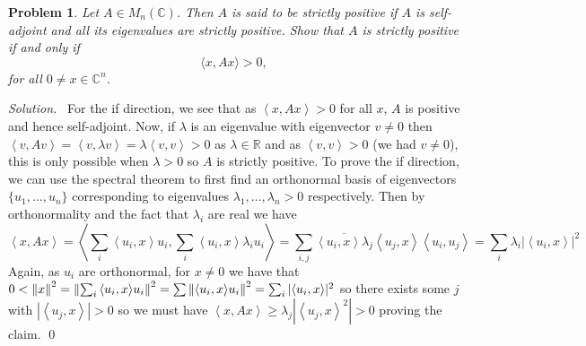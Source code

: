 \documentclass[12pt,a4paper]{article}
\newenvironment{solution}{%
  \par\noindent\textit{Solution.}\ }{\qed}
\theoremstyle{problemstyle}
\newtheorem{problem}{Problem}[section]
\def\bR{\mathbb{R}}
\newcommand{\ipp}[1]{{\left\langle{#1}\right\rangle}}
\begin{document}
\begin{problem}\label{prob:4-10}
Let $A \in M_n(\mathbb{C})$. Then $A$ is said to be \emph{strictly positive} if $A$ is self-adjoint and all its eigenvalues are strictly positive. Show that $A$ is strictly positive if and only if
\[
\langle x, Ax \rangle > 0,
\]
for all $0 \neq x \in \mathbb{C}^n$.
\end{problem}
\begin{solution}
	For the if direction, we see that as $\ipp{x,Ax}>0$ for all $x$, $A$ is positive and hence self-adjoint. 
	Now, if $\lambda$ is an eigenvalue with eigenvector $v\neq 0$ then $\ipp{v,Av}=\ipp{v,\lambda v}=\lambda\ipp{v,v}>0$ as $\lambda\in\bR$ and as $\ipp{v,v}>0$ (we had $v\neq 0$), this is only possible when $\lambda>0$ so $A$ is strictly positive. 
	To prove the if direction, we can use the spectral theorem to first find an orthonormal basis of eigenvectors $\{u_1,\ldots,u_n\}$ corresponding to eigenvalues $\lambda_1,\ldots,\lambda_n>0$ respectively. 
	Then by orthonormality and the fact that $\lambda_i$ are real we have 
	\[
		\ipp{x,Ax}=\ipp{\sum_i\ipp{u_i,x}u_i,\sum_i\ipp{u_i,x}\lambda_iu_i}=\sum_{i,j}\overline{\ipp{u_i,x}\lambda_j}\ipp{u_j,x}\ipp{u_i,u_j}=\sum_i\lambda_i|\ipp{u_i,x}|^2
	\]
	Again, as $u_i$ are orthonormal, for $x\neq 0$ we have that $0<\norm{x}^2=\norm{\sum_i\ipp{u_i,x}u_i}^2=\sum\norm{\ipp{u_i,x}u_i}^2=\sum_i|\ipp{u_i,x}|^2$ so there exists some $j$ with $|\ipp{u_j,x}|>0$ so we must have $\ipp{x,Ax}\geq\lambda_j|\ipp{u_j,x}^2|>0$ proving the claim.
\end{solution}
\end{document}
